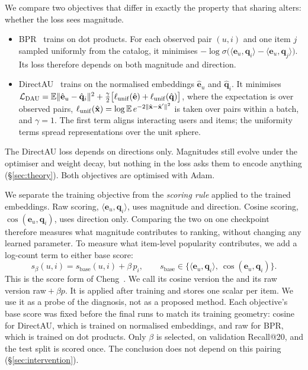 We compare two objectives that differ in exactly the property that sharing alters: whether the loss sees magnitude.
\begin{itemize}
\item BPR~\cite{rendle2009bpr} trains on dot products. For each observed pair $(u,i)$ and one item $j$ sampled uniformly from the catalog, it minimises $-\log\sigma\bigl(\langle\mathbf{e}_u,\mathbf{q}_i\rangle-\langle\mathbf{e}_u,\mathbf{q}_j\rangle\bigr)$. Its loss therefore depends on both magnitude and direction.
\item DirectAU~\cite{wang2022directau} trains on the normalised embeddings $\hat{\mathbf{e}}_u$ and $\hat{\mathbf{q}}_i$. It minimises $\mathcal{L}_{\mathrm{DAU}}=\mathbb{E}\|\hat{\mathbf{e}}_u-\hat{\mathbf{q}}_i\|^2+\tfrac{\gamma}{2}\bigl[\ell_{\mathrm{unif}}(\hat{\mathbf{e}})+\ell_{\mathrm{unif}}(\hat{\mathbf{q}})\bigr]$, where the expectation is over observed pairs, $\ell_{\mathrm{unif}}(\hat{\mathbf{x}})=\log\mathbb{E}\,e^{-2\|\hat{\mathbf{x}}-\hat{\mathbf{x}}'\|^2}$ is taken over pairs within a batch, and $\gamma=1$. The first term aligns interacting users and items; the uniformity terms spread representations over the unit sphere.
\end{itemize}
The DirectAU loss depends on directions only. Magnitudes still evolve under the optimiser and weight decay, but nothing in the loss asks them to encode anything (\S\ref{sec:theory}). Both objectives are optimised with Adam.

We separate the training objective from the \emph{scoring rule} applied to the trained embeddings. Raw scoring, $\langle\mathbf{e}_u,\mathbf{q}_i\rangle$, uses magnitude and direction. Cosine scoring, $\cos(\mathbf{e}_u,\mathbf{q}_i)$, uses direction only. Comparing the two on one checkpoint therefore measures what magnitude contributes to ranking, without changing any learned parameter. To measure what item-level popularity contributes, we add a log-count term to either base score:
\begin{equation}\label{eq:score}
  s_\beta(u,i)=s_{\mathrm{base}}(u,i)+\beta\,p_i,\qquad
  s_{\mathrm{base}}\in\bigl\{\langle\mathbf{e}_u,\mathbf{q}_i\rangle,\ \cos(\mathbf{e}_u,\mathbf{q}_i)\bigr\}.
\end{equation}
This is the score form of Cheng~\cite[eq.~53]{cheng2026rankone}. We call its cosine version the \crs{} and its raw version raw${}+\beta p$. It is applied after training and stores one scalar per item. We use it as a probe of the diagnosis, not as a proposed method. Each objective's base score was fixed before the final runs to match its training geometry: cosine for DirectAU, which is trained on normalised embeddings, and raw for BPR, which is trained on dot products. Only $\beta$ is selected, on validation Recall@20, and the test split is scored once. The conclusion does not depend on this pairing (\S\ref{sec:intervention}).

